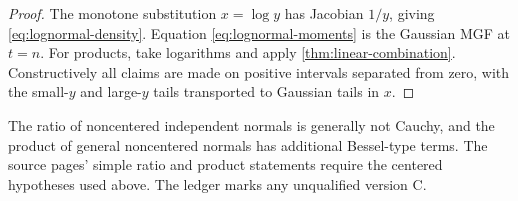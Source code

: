 \begin{proof}
The monotone substitution $x=\log y$ has Jacobian $1/y$, giving \eqref{eq:lognormal-density}.  Equation \eqref{eq:lognormal-moments} is the Gaussian MGF at $t=n$.  For products, take logarithms and apply \cref{thm:linear-combination}.  Constructively all claims are made on positive intervals separated from zero, with the small-$y$ and large-$y$ tails transported to Gaussian tails in $x$.
\end{proof}

\begin{remark}
The ratio of noncentered independent normals is generally not Cauchy, and the product of general noncentered normals has additional Bessel-type terms.  The source pages' simple ratio and product statements require the centered hypotheses used above.  The ledger marks any unqualified version C.
\end{remark}
